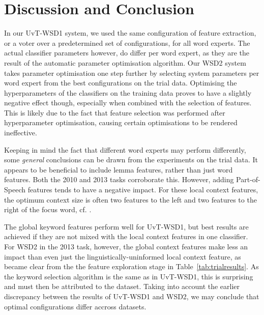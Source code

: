 \section{Discussion and Conclusion}




In our UvT-WSD1 system, we used the same configuration of feature extraction,
or a voter over a predetermined set of configurations, for all word experts. The actual
classifier parameters however, do differ per word expert, as they are the
result of the automatic parameter optimisation algorithm. Our WSD2 system
takes parameter optimisation one step further by selecting system parameters
per word expert from the best configurations on the trial data. Optimising the
hyperparameters of the classifiers on the training data proves to have a
slightly negative effect though, especially when combined with the selection of
features. This is likely due to the fact that feature selection was performed
after hyperparameter optimisation, causing certain optimisations to be rendered
ineffective.

Keeping in mind the fact that different word experts may perform differently,
some \emph{general} conclusions can be drawn from the experiments on the trial
data. It appears to be beneficial to include lemma features, rather than just
word features. Both the 2010 and 2013 tasks corroborate this. However, adding
Part-of-Speech features tends to have a negative impact. For these local
context features, the optimum context size is often two features to the left
and two features to the right of the focus word, cf.  \citep{Hendrickx+02}.

The global keyword features perform well for UvT-WSD1, but best results are
achieved if they are not mixed with the local context features in one
classifier. For WSD2 in the 2013 task, however, the global context features
make less an impact than even just the linguistically-uninformed local context
feature, as became clear from the the feature exploration stage in
Table~\ref{tab:trialresults}. As the keyword selection algorithm is the same
as in UvT-WSD1, this is surprising and must then be attributed to the dataset.
Taking into account the earlier discrepancy between the results of UvT-WSD1 and
WSD2, we may conclude that optimal configurations differ accross datasets.

